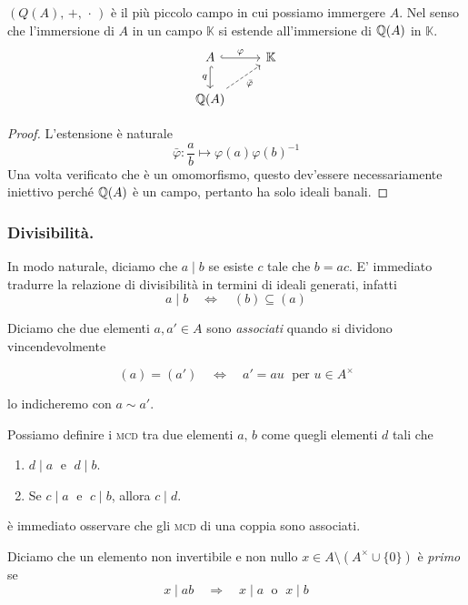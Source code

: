 \begin{multicols}{2}
\begin{theorem}
	$ (Q(A),\, +,\, \cdot\,) $ è il più piccolo campo in cui possiamo immergere $ A $. Nel senso che l'immersione di $ A $ in un campo $ \mathbb{K} $ si estende all'immersione di $ \mathbb{Q}(A) $ in $ \mathbb{K} $.
	\[ \begin{tikzcd}
	A \arrow[hook]{r}{\varphi} \arrow[swap, hook]{d}{q} & \K \\
	\Q(A) \arrow[swap, dashed]{ru}{\bar{\varphi}}
	\end{tikzcd} \]
\end{theorem}
\begin{proof}
	L'estensione è naturale
	\[ \bar{\varphi}: \frac{a}{b} \mapsto \varphi(a) \varphi(b)^{-1} \]
	Una volta verificato che è un omomorfismo, questo dev'essere necessariamente iniettivo perché $ \mathbb{Q}(A) $ è un campo, pertanto ha solo ideali banali.
\end{proof}

\columnbreak
\subsubsection{Divisibilità.}
In modo naturale, diciamo che $ a \mid b $ se esiste $ c  $ tale che $ b = ac $. E' immediato tradurre la relazione di divisibilità in termini di ideali generati, infatti 
\[ a \mid b \quad\Leftrightarrow\quad (b) \subseteq (a) \]

\begin{definition}
	Diciamo che due elementi $ a, a' \in A $ sono \emph{associati} quando si dividono vincendevolmente

\[ (a) = (a') \quad\Leftrightarrow\quad a' = au \;\text{ per } u \in A^\times \]

lo indicheremo con $ a \sim a' $.
\end{definition}

Possiamo definire  i \textsc{mcd} tra due elementi $ a,\, b $ come quegli elementi $ d $ tali che
\begin{enumerate}
	\item $ d \mid a \;$   e   $\; d \mid b $.
	\item Se $ c \mid a\; $ e $ \; c \mid b $, allora $ c \mid d $.
\end{enumerate}
è immediato osservare che gli \textsc{mcd} di una coppia sono associati.

\begin{definition}[Primo]
	Diciamo che un elemento non invertibile e non nullo $ x \in A\setminus(A^\times \cup \{0\}) $ è \emph{primo} se \[ x \mid ab \quad\Rightarrow\quad x \mid a \; \text{ o }\; x \mid b \]
\end{definition}


\end{multicols}
